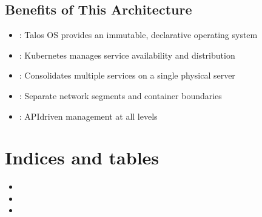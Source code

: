 \documentclass[letterpaper,10pt,english]{sphinxmanual}
\begin{document}
\section{Benefits of This Architecture}
\label{\detokenize{SDA:benefits-of-this-architecture}}\begin{itemize}
\item {} 
\sphinxAtStartPar
{}: Talos OS provides an immutable, declarative operating system

\item {} 
\sphinxAtStartPar
{}: Kubernetes manages service availability and distribution

\item {} 
\sphinxAtStartPar
{}: Consolidates multiple services on a single physical server

\item {} 
\sphinxAtStartPar
{}: Separate network segments and container boundaries

\item {} 
\sphinxAtStartPar
{}: API\sphinxhyphen{}driven management at all levels

\end{itemize}


\chapter{Indices and tables}
\label{\detokenize{index:indices-and-tables}}\begin{itemize}
\item {} 
\sphinxAtStartPar
{}

\item {} 
\sphinxAtStartPar
{}

\item {} 
\sphinxAtStartPar
{}

\end{itemize}



\renewcommand{\indexname}{Index}
\printindex
\end{document}
